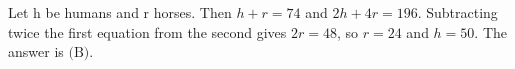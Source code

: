 Let h be humans and r horses. Then $h+r=74$ and $2 h+4 r=196$. Subtracting twice the first equation from the second gives $2 r=48$, so $r=24$ and $h=50$. The answer is $\boxed{\text{(B)}}$.
